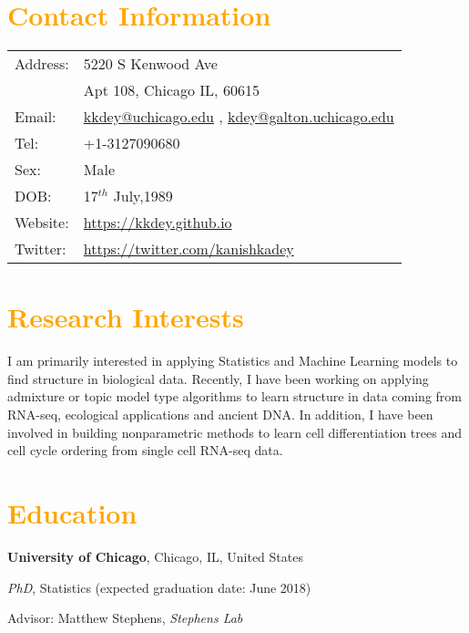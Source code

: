 \documentclass[margin,line]{res}
\newenvironment{list1}{
  \begin{list}{\ding{113}}{%
      \setlength{\itemsep}{0in}
      \setlength{\parsep}{0in} \setlength{\parskip}{0in}
      \setlength{\topsep}{0in} \setlength{\partopsep}{0in} 
      \setlength{\leftmargin}{0.17in}}}{\end{list}}
\begin{document}


\begin{resume}
\section{\sc \textcolor{Orange}{Contact Information}}
\vspace{.05in}
\begin{tabular}{@{}p{0.5in}p{4in}}
Address: & 5220 S Kenwood Ave\\
               & Apt 108, Chicago IL, 60615  \\ [2 pt]
Email:     & \href{kkdey@uchicago.edu}{kkdey@uchicago.edu} , 
		\href{kdey@galton.uchicago.edu}{kdey@galton.uchicago.edu} \\ [3 pt]
             
Tel:         & +1-3127090680\\ [2 pt]
Sex:       &  Male \\ [2 pt]
DOB:      & 17$^{th}$ July,1989 \\
Website:  & \url{https://kkdey.github.io} \\
Twitter: &  \url{https://twitter.com/kanishkadey}

\end{tabular}


\section{\sc \textcolor{Orange}{Research Interests}}

I am primarily interested in applying Statistics and Machine Learning models to find structure in biological data. Recently, I have been working on applying admixture or topic model type algorithms to learn structure in data coming from RNA-seq, ecological applications and ancient DNA. In addition, I have been involved in building nonparametric methods to learn cell differentiation trees and cell cycle ordering from single cell RNA-seq data.

\section{\sc \textcolor{Orange}{Education}}
{\bf University of Chicago}, Chicago, IL, United States\\
\vspace*{-.1in}
\begin{list1}
\item[] \emph{PhD}, Statistics (expected graduation date: June 2018)
\item[] Advisor: Matthew Stephens, \textit{Stephens Lab}
\end{list1} 


\end{resume}
\end{document}

